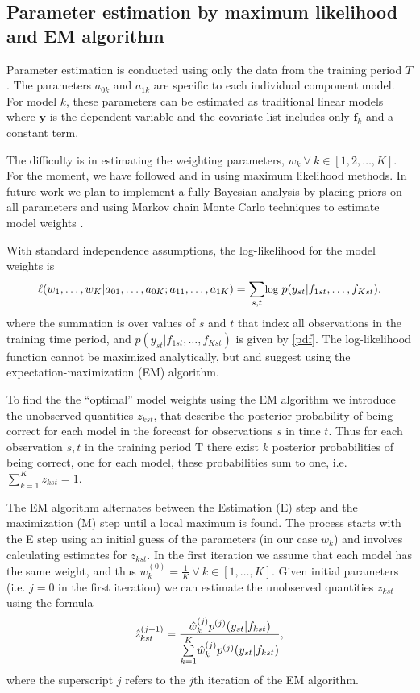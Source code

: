 \documentclass[12pt,fullpage]{article}
\begin{document}
\subsection{Parameter estimation by maximum likelihood and EM
algorithm}

Parameter estimation is conducted using only the data from the
training period $T$.  The parameters $a_{0k}$ and $a_{1k}$ are
specific to each individual component model.  For model $k$, these
parameters can be estimated as traditional linear models where
$\mathbf{y}$ is the dependent variable and the covariate list includes
only $\mathbf{f}_k$ and a constant term.

The difficulty is in estimating the weighting parameters,
$w_k~\forall~ k \in [1, 2, \dots, K]$. For the moment, we have
followed \citet{Raftery:2005} and \citet{Sloughter:2007} in using
maximum likelihood methods. In future work we plan to implement a
fully Bayesian analysis by placing priors on all parameters and using
Markov chain Monte Carlo techniques to estimate model weights
\citep[c.f.][]{Vrugt:2008}.

With standard independence assumptions, the log-likelihood for the
model weights is
\begin{equation}
\small
  \ell (w_1, \ldots, w_K | a_{01},  \ldots, a_{0K}; a_{11},
  \ldots, a_{1K})= \underset{s,t}{\sum}\mbox{log }p(y_{st} |
  f_{1st}, \ldots, f_{Kst}).
\end{equation}
\noindent where the summation is over values of $s$ and $t$ that index
all observations in the training time period, and $p(y_{st}|f_{1st},
\ldots, f_{Kst}) $ is given by \eqref{pdf}. The log-likelihood
function cannot be maximized analytically, but \citet{Raftery:2005}
and \citet{Sloughter:2007} suggest using the expectation-maximization
(EM) algorithm.

To find the the ``optimal'' model weights using the EM algorithm we introduce the unobserved quantities $z_{kst}$, that describe the posterior probability of being correct for each model in the forecast for observations $s$ in time $t$. Thus for each observation $s,t$ in the training period T there exist $k$ posterior probabilities of being correct, one for each model, these probabilities sum to one, i.e. $\sum_{k=1}^K z_{kst} =1$.  

The EM algorithm alternates between the Estimation (E) step and the maximization (M) step until a local maximum is found. The process starts with the E step using an initial guess of the parameters (in our case $w_k$) and involves calculating estimates for $z_{kst}$. In the first iteration we assume that each model has the same weight, and thus $w_k^{(0)} =  \frac{1}{K} ~ \forall ~ k \in [1, \ldots, K]$. Given initial parameters (i.e. $j=0$ in the first iteration) we can estimate the unobserved quantities $z_{kst}$ using the formula
\begin{equation}
\small
\hat{z}^{(j+1)}_{kst} = \frac{\hat{w}^{(j)}_k
p^{(j)}(y_{st}|f_{kst})}{\overset{K}{\underset{k=1}{\sum}}\hat{w}^{(j)}_kp^{(j)}(y_{st}|f_{kst})},
\end{equation}
\noindent where the superscript $j$ refers to the $j$th iteration of the EM algorithm.
\end{document}
